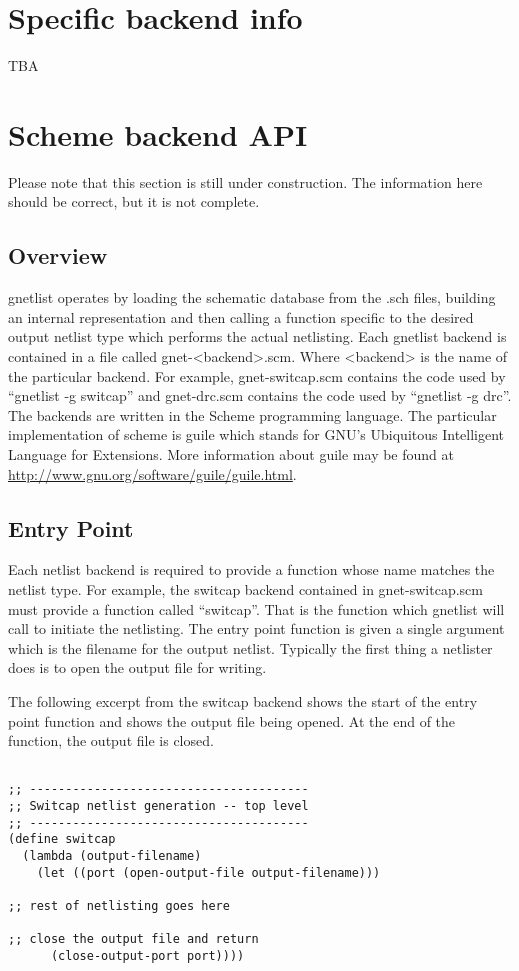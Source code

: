 \documentclass{article}
\begin{document}
\section{Specific backend info}
TBA

\section{Scheme backend API}
Please note that this section is still under construction.  The
information here should be correct, but it is not complete.

\subsection{Overview}
gnetlist operates by loading the schematic database from the .sch
files, building an internal representation and then calling a function
specific to the desired output netlist type which performs the actual
netlisting.  Each gnetlist backend is contained in a file called
gnet-<backend>.scm.  Where <backend> is the name of the particular
backend.  For example, gnet-switcap.scm contains the code used by
``gnetlist -g switcap'' and gnet-drc.scm contains the code used by
``gnetlist -g drc''.  The backends are written in the Scheme
programming language.  The particular implementation of scheme is
guile which stands for GNU's Ubiquitous Intelligent Language for
Extensions.  More information about guile may be found at
\url{http://www.gnu.org/software/guile/guile.html}. 

\subsection{Entry Point}
Each netlist backend is required to provide a function whose name
matches the netlist type.  For example, the switcap backend contained
in gnet-switcap.scm must provide a function called ``switcap''.  That
is the function which gnetlist will call to initiate the netlisting.
The entry point function is given a single argument which is the
filename for the output netlist.  Typically the first thing a
netlister does is to open the output file for writing.

The following excerpt from the switcap backend shows the start of the
entry point function and shows the output file being opened.  At the
end of the function, the output file is closed.
\begin{verbatim}

;; ---------------------------------------
;; Switcap netlist generation -- top level
;; ---------------------------------------
(define switcap
  (lambda (output-filename)
    (let ((port (open-output-file output-filename)))

;; rest of netlisting goes here

;; close the output file and return
      (close-output-port port))))

\end{verbatim}
\end{document}
